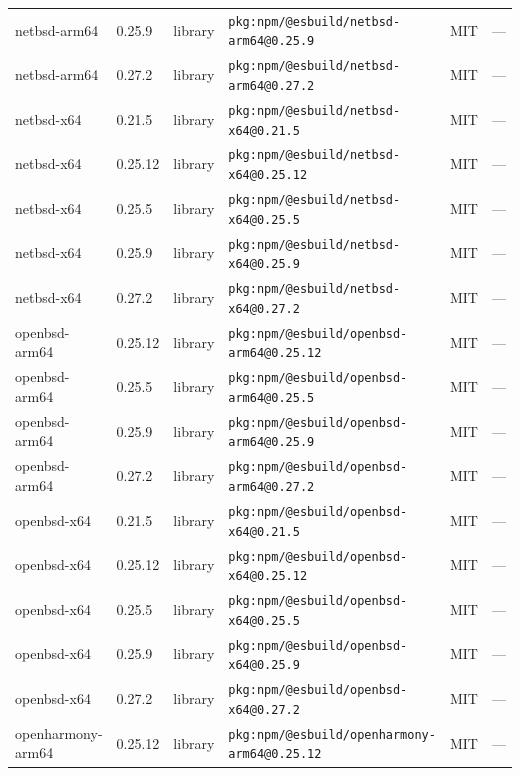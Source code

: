 \documentclass[11pt,a4paper]{article}
\begin{document}
\begin{longtable}{|p{4cm}|p{2cm}|p{1.6cm}|p{5cm}|p{1.5cm}|p{3.5cm}|}
\raggedright netbsd-arm64 & 0.25.9 & library & \small\texttt{pkg:npm/@esbuild/netbsd-arm64@0.25.9} & MIT & \small — \\
\raggedright netbsd-arm64 & 0.27.2 & library & \small\texttt{pkg:npm/@esbuild/netbsd-arm64@0.27.2} & MIT & \small — \\
\raggedright netbsd-x64 & 0.21.5 & library & \small\texttt{pkg:npm/@esbuild/netbsd-x64@0.21.5} & MIT & \small — \\
\raggedright netbsd-x64 & 0.25.12 & library & \small\texttt{pkg:npm/@esbuild/netbsd-x64@0.25.12} & MIT & \small — \\
\raggedright netbsd-x64 & 0.25.5 & library & \small\texttt{pkg:npm/@esbuild/netbsd-x64@0.25.5} & MIT & \small — \\
\raggedright netbsd-x64 & 0.25.9 & library & \small\texttt{pkg:npm/@esbuild/netbsd-x64@0.25.9} & MIT & \small — \\
\raggedright netbsd-x64 & 0.27.2 & library & \small\texttt{pkg:npm/@esbuild/netbsd-x64@0.27.2} & MIT & \small — \\
\raggedright openbsd-arm64 & 0.25.12 & library & \small\texttt{pkg:npm/@esbuild/openbsd-arm64@0.25.12} & MIT & \small — \\
\raggedright openbsd-arm64 & 0.25.5 & library & \small\texttt{pkg:npm/@esbuild/openbsd-arm64@0.25.5} & MIT & \small — \\
\raggedright openbsd-arm64 & 0.25.9 & library & \small\texttt{pkg:npm/@esbuild/openbsd-arm64@0.25.9} & MIT & \small — \\
\raggedright openbsd-arm64 & 0.27.2 & library & \small\texttt{pkg:npm/@esbuild/openbsd-arm64@0.27.2} & MIT & \small — \\
\raggedright openbsd-x64 & 0.21.5 & library & \small\texttt{pkg:npm/@esbuild/openbsd-x64@0.21.5} & MIT & \small — \\
\raggedright openbsd-x64 & 0.25.12 & library & \small\texttt{pkg:npm/@esbuild/openbsd-x64@0.25.12} & MIT & \small — \\
\raggedright openbsd-x64 & 0.25.5 & library & \small\texttt{pkg:npm/@esbuild/openbsd-x64@0.25.5} & MIT & \small — \\
\raggedright openbsd-x64 & 0.25.9 & library & \small\texttt{pkg:npm/@esbuild/openbsd-x64@0.25.9} & MIT & \small — \\
\raggedright openbsd-x64 & 0.27.2 & library & \small\texttt{pkg:npm/@esbuild/openbsd-x64@0.27.2} & MIT & \small — \\
\raggedright openharmony-arm64 & 0.25.12 & library & \small\texttt{pkg:npm/@esbuild/openharmony-arm64@0.25.12} & MIT & \small — \\

\end{longtable}
\end{document}
